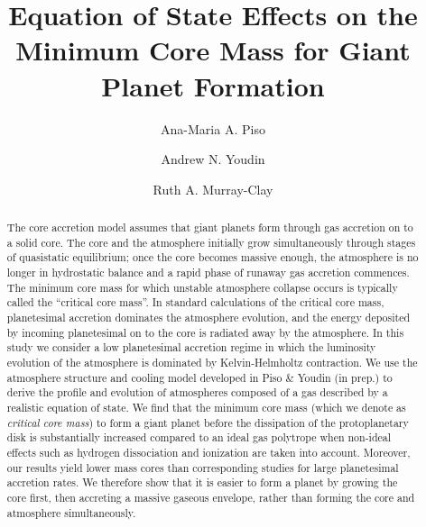 \documentclass[apj]{emulateapj}
\begin{document}



\title{Equation of State Effects on the Minimum Core Mass for Giant Planet Formation}
\author{Ana-Maria A. Piso}
\author{Andrew N. Youdin}
\author{Ruth A. Murray-Clay}

\begin{abstract}

The core accretion model assumes that giant planets form through gas accretion on to a solid core. The core and the atmosphere initially grow simultaneously through stages of quasistatic equilibrium; once the core becomes massive enough, the atmosphere is no longer in hydrostatic balance and a rapid phase of runaway gas accretion commences. The minimum core mass for which unstable atmosphere collapse occurs is typically called the ``critical core mass''. In standard calculations of the critical core mass, planetesimal accretion dominates the atmosphere evolution, and the energy deposited by incoming planetesimal on to the core is radiated away by the atmosphere. In this study we consider a low planetesimal accretion regime in which the luminosity evolution of the atmosphere is dominated by Kelvin-Helmholtz contraction. We use the atmosphere structure and cooling model developed in Piso \& Youdin (in prep.) to derive the profile and evolution of atmospheres composed of a gas described by a realistic equation of state. We find that the minimum core mass (which we denote as \textit{critical core mass}) to form a giant planet before the dissipation of the protoplanetary disk is substantially increased compared to an ideal gas polytrope when non-ideal effects such as hydrogen dissociation and ionization are taken into account. Moreover, our results yield lower mass cores than corresponding studies for large planetesimal accretion rates. We therefore show that it is easier to form a planet by growing the core first, then accreting a massive gaseous envelope, rather than forming the core and atmosphere simultaneously.





\end{abstract}
\end{document}
